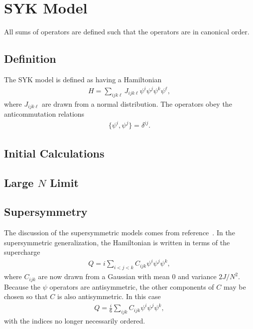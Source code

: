 \documentclass[12pt]{article} %
\renewcommand{\l}{\ell}
\begin{document}
\section{SYK Model}

All sums of operators are defined such that the operators are in canonical order.

\subsection{Definition} \emph{}

The SYK model is defined as having a Hamiltonian
\begin{align}
H = \sum_{ijk\l}J_{ijk\l}\psi^i\psi^j\psi^k\psi^\l,
\end{align}
where $J_{ijk\l}$ are drawn from a normal distribution. The operators obey the anticommutation relations
\begin{align}
\{\psi^i,\psi^j\} = \delta^{ij}.
\end{align}

\subsection{Initial Calculations}

\subsection{Large $N$ Limit}

\subsection{Supersymmetry}\emph{}

The discussion of the supersymmetric models comes from reference~\cite{fu16}. In the supersymmetric generalization, the Hamiltonian is written in terms of the supercharge
\begin{align}
Q = i\sum_{i<j<k}C_{ijk}\psi^i\psi^j\psi^k,
\end{align}
where $C_{ijk}$ are now drawn from a Gaussian with mean 0 and variance $2J/N^2$. Because the $\psi$ operators are antisymmetric, the other components of $C$ may be chosen so that $C$ is also antisymmetric. In this case 
\begin{align}
Q = \frac{i}{6}\sum_{ijk}C_{ijk}\psi^i\psi^j\psi^k,
\end{align}
with the indices no longer necessarily ordered.
\end{document}
